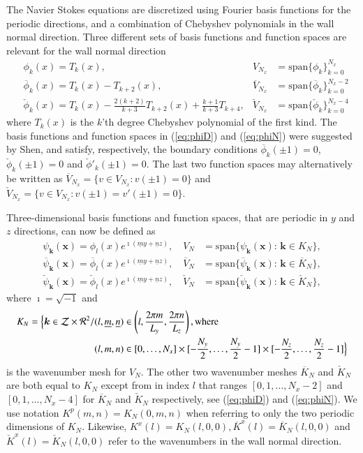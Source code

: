 \documentclass[preprint]{elsarticle}
\newcommand{\N}[1]{\check{#1}}
\newcommand{\D}[1]{\overline{#1}}
\begin{document}
The Navier Stokes equations are discretized using Fourier basis functions for the periodic directions, and a combination of Chebyshev polynomials in the wall normal direction. Three different sets of basis functions and function spaces are relevant for the wall normal direction
\begin{align}
&  \phi_k(x) = T_k(x), & V_{N_x} &= \text{span}\{\phi_k\}_{k=0}^{N_x} \label{eq:Tk}\\
& \D{\phi}_k(x) = T_k(x) - T_{k+2}(x), & \D{V}_{N_x} &= \text{span} \{ \D{\phi}_k\}_{k=0}^{N_x-2} \label{eq:phiD}\\
& \N{\phi}_k(x) = T_k(x) - \frac{2(k+2)}{k+3} T_{k+2}(x) + 
\frac{k+1}{k+3} T_{k+4}, & \N{V}_{N_x} &= \text{span} \{\N{\phi}_k\}_{k=0}^{N_x-4} \label{eq:phiN} 
\end{align}
where $T_k(x)$ is the $k$'th degree Chebyshev polynomial of the first kind. The 
basis functions and function spaces in (\ref{eq:phiD}) and (\ref{eq:phiN}) were 
suggested by Shen, and satisfy, respectively, the boundary conditions 
$\D{\phi}_k(\pm 1) = 0$, $\N{\phi}_k(\pm 1)=0$ and $\N{\phi}'_k(\pm 1)=0$. The 
last two function spaces may alternatively be written as $\D{V}_{N_x} = \{v \in 
V_{N_x}: v(\pm 1)=0 \}$ and $\N{V}_{N_x} = \{v \in V_{N_x}: v(\pm 1) = v'(\pm 
1) = 0 \}$.  

Three-dimensional basis functions and function spaces, that are periodic in $y$ 
and $z$ directions, can now be defined as
\begin{align}
  \psi_{\bm{k}}(\bm{x}) = \phi_{l}(x)e^{ \imath(\underline{m} y + \underline{n} z)}, \quad V_N &= \text{span} \{ \psi_{\bm{k}}(\bm{x}):\, \bm{k} \in K_N  \}, \\
  \D{\psi}_{\bm{k}}(\bm{x}) = \D{\phi}_{l}(x)e^{ \imath(\underline{m} y + \underline{n} z)}, \quad \D{V}_N &= \text{span} \{ \D{\psi}_{\bm{k}}(\bm{x}):\, \bm{k} \in \D{K}_N  \}, \\
  \N{\psi}_{\bm{k}}(\bm{x}) = \N{\phi}_{l}(x)e^{ \imath(\underline{m} y + \underline{n} z)}, \quad \N{V}_N &= \text{span} \{ \N{\psi}_{\bm{k}}(\bm{x}):\, \bm{k} \in \N{K}_N  \},
\end{align}
where $\imath=\sqrt{-1}$ and 
\begin{align}
K_N = \Big\{\bm{k} \in \mathcal{Z}\times\mathcal{R}^2 / &(l, \underline{m}, \underline{n}) \in \left( l, \frac{2 \pi m}{L_y}, \frac{2 \pi n}{L_z} \right), \text{where} \notag \\
 &(l, m, n) \in  [0, \ldots, N_x] \times [-\frac{N_y}{2},\ldots, 
 \frac{N_y}{2}-1] \times[-\frac{N_z}{2},\ldots, \frac{N_z}{2}-1] \Big\} 
 \label{eq:wavenumbermesh}
\end{align}
is the wavenumber mesh for $V_N$. The other two wavenumber meshes $\D{K}_N$ and 
$\N{K}_N$ are both equal to $K_N$ except from in index $l$ that 
ranges $[0, 1, \ldots, N_x-2]$ and $[0, 1, \ldots, N_x-4]$ for $\D{K}_N$ 
and $\N{K}_N$ respectively, see (\ref{eq:phiD}) and (\ref{eq:phiN}). We use 
notation $K^p(m, n)=K_N(0, m, n)$ when referring to only the two periodic 
dimensions of $K_N$. Likewise, ${K}^x(l)={K}_N(l, 0, 0), \D{K}^x(l)=\D{K}_N(l, 0, 0)$ and $\N{K}^x(l)=\N{K}_N(l, 0, 0)$ refer to the wavenumbers in the wall normal direction.
\end{document}
